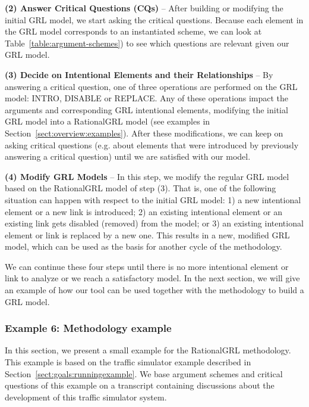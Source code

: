 \textbf{(2) Answer Critical Questions (CQs)} -- After building or modifying the initial GRL model, we start asking the critical questions. Because each element in the GRL model corresponds to an instantiated scheme, we can look at Table~\ref{table:argument-schemes}) to see which questions are relevant given our GRL model. 

\textbf{(3) Decide on Intentional Elements and their Relationships} -- By answering a critical question, one of three operations are performed on the GRL model: \textsf{INTRO}, \textsf{DISABLE} or \textsf{REPLACE}. Any of these operations impact the arguments and corresponding GRL intentional elements, modifying the initial GRL model into a RationalGRL model (see examples in Section~\ref{sect:overview:examples}). After these modifications, we can keep on asking critical questions (e.g. about elements that were introduced by previously answering a critical question) until we are satisfied with our model.   

\textbf{(4) Modify GRL Models} -- In this step, we modify the regular GRL model based on the RationalGRL model of step (3). That is, one of the following situation can happen with respect to the initial GRL model: 1) a new intentional element or a new link is introduced; 2) an existing intentional element or an existing link gets disabled (removed) from the model; or 3) an existing intentional element or link is replaced by a new one. This results in a new, modified GRL model, which can be used as the basis for another cycle of the methodology. 

We can continue these four steps until there is no more intentional element or link to analyze or we reach a satisfactory model. In the next section, we will give an example of how our tool can be used together with the methodology to build a GRL model.  

\iffalse%
\subsubsection{Example 6: Methodology example}

In this section, we present a small example for the RationalGRL methodology. This example is based on the traffic simulator example described in Section~\ref{sect:goals:runningexample}. We base argument schemes and critical questions of this example on a transcript containing discussions about the development of this traffic simulator system. %

